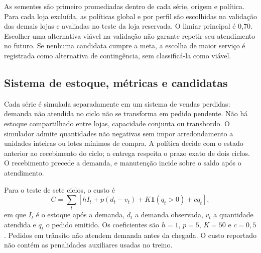 As sementes são primeiro promediadas dentro de cada série, origem e política. Para cada loja excluída, as políticas global e por perfil são escolhidas na validação das demais lojas e avaliadas no teste da loja reservada. O limiar principal é 0,70. Escolher uma alternativa viável na validação não garante repetir seu atendimento no futuro. Se nenhuma candidata cumpre a meta, a escolha de maior serviço é registrada como alternativa de contingência, sem classificá-la como viável.


\subsection{Sistema de estoque, métricas e candidatas}

Cada série é simulada separadamente em um sistema de vendas perdidas: demanda não atendida no ciclo não se transforma em pedido pendente. Não há estoque compartilhado entre lojas, capacidade conjunta ou transbordo. O simulador admite quantidades não negativas sem impor arredondamento a unidades inteiras ou lotes mínimos de compra. A política decide com o estado anterior ao recebimento do ciclo; a entrega respeita o prazo exato de dois ciclos. O recebimento precede a demanda, e manutenção incide sobre o saldo após o atendimento.

Para o teste de sete ciclos, o custo é
\begin{equation}
C=\sum_t\left[hI_t+p(d_t-v_t)+K\mathbf{1}(q_t>0)+cq_t\right],
\end{equation}
em que $I_t$ é o estoque após a demanda, $d_t$ a demanda observada, $v_t$ a quantidade atendida e $q_t$ o pedido emitido. Os coeficientes são $h=1$, $p=5$, $K=50$ e $c=0{,}5$. Pedidos em trânsito não atendem demanda antes da chegada. O custo reportado não contém as penalidades auxiliares usadas no treino.

